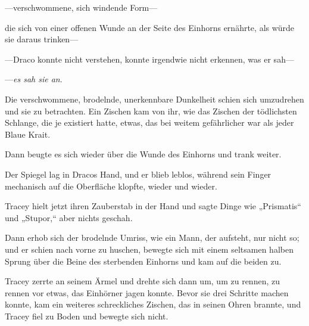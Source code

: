 —verschwommene, sich windende Form—

die sich von einer offenen Wunde an der Seite des Einhorns ernährte, als würde sie daraus trinken—

—Draco konnte nicht verstehen, konnte irgendwie nicht erkennen, was er sah—

—\emph{es sah sie an}.

Die verschwommene, brodelnde, unerkennbare Dunkelheit schien sich umzudrehen und sie zu betrachten. Ein Zischen kam von ihr, wie das Zischen der tödlichsten Schlange, die je existiert hatte, etwas, das bei weitem gefährlicher war als jeder Blaue Krait.

Dann beugte es sich wieder über die Wunde des Einhorns und trank weiter.

Der Spiegel lag in Dracos Hand, und er blieb leblos, während sein Finger mechanisch auf die Oberfläche klopfte, wieder und wieder.

Tracey hielt jetzt ihren Zauberstab in der Hand und sagte Dinge wie „Prismatis“ und „Stupor,“ aber nichts geschah.

Dann erhob sich der brodelnde Umriss, wie ein Mann, der aufsteht, nur nicht so; und er schien nach vorne zu huschen, bewegte sich mit einem seltsamen halben Sprung über die Beine des sterbenden Einhorns und kam auf die beiden zu.

Tracey zerrte an seinem Ärmel und drehte sich dann um, um zu rennen, zu rennen vor etwas, das Einhörner jagen konnte. Bevor sie drei Schritte machen konnte, kam ein weiteres schreckliches Zischen, das in seinen Ohren brannte, und Tracey fiel zu Boden und bewegte sich nicht.

